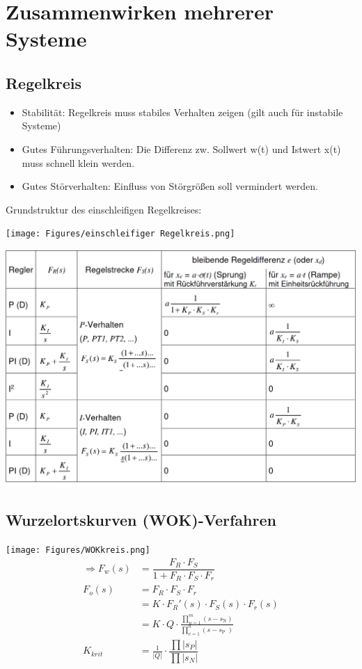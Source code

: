 \section{Zusammenwirken mehrerer Systeme}
\subsection{Regelkreis}
\begin{mdframed}[style=exercise,frametitle=Anforderungen:]
	\begin{itemize}[leftmargin=*]
		\item Stabilität: Regelkreis muss stabiles Verhalten zeigen (gilt
		      auch für instabile Systeme)
		\item Gutes Führungsverhalten: Die Differenz zw. Sollwert w(t) und
		      Istwert x(t) muss schnell klein werden.
		\item Gutes Störverhalten: Einfluss von Störgrößen soll vermindert
		      werden.
	\end{itemize}
\end{mdframed}

Grundstruktur des einschleifigen Regelkreises:

\texttt{[image: Figures/einschleifiger Regelkreis.png]}

\includegraphics[width=0.98\columnwidth]{Figures/Reglerauswahl.png}


\subsection{Wurzelortskurven (WOK)-Verfahren}

\texttt{[image: Figures/WOKkreis.png]}
\begin{align*}
	\Rightarrow F_w (s) &= \dfrac {F_R \cdot F_S} {1+F_R \cdot F_S \cdot F_r} \\
				F_o(s) 	&= F_R \cdot F_S \cdot F_r \\
						& =K \cdot F_R '(s) \cdot F_S (s) \cdot F_r (s) \\
						& =K \cdot Q \cdot \frac{\prod_{u=1}^{m}\left(s-s_{\text {N}}\right)}{\prod_{v=1}^{n}\left(s-s_{\text {P }}\right)} \\
	K_{krit} 			&= \frac{1}{|Q|} \cdot \dfrac{\prod |s_{P}|}{\prod |s_{N}|}
\end{align*}

